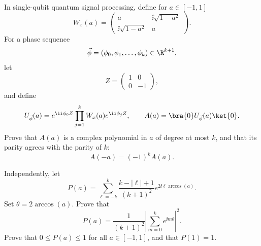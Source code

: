 In single-qubit quantum signal processing, define for $a\in[-1,1]$
$$
    W_x(a)
    =
    \begin{pmatrix}
        a & \ii\sqrt{1-a^2}\\
        \ii\sqrt{1-a^2} & a
    \end{pmatrix}.
$$
For a phase sequence
$$
    \vec\phi=(\phi_0,\phi_1,\dots,\phi_k)\in\R^{k+1},
$$
let
$$
    Z=\begin{pmatrix}1&0\\0&-1\end{pmatrix},
$$
and define
$$
    U_{\vec\phi}(a)
    =
    e^{\ii\phi_0 Z}
    \prod_{j=1}^k
    W_x(a)e^{\ii\phi_jZ},
    \qquad
    A(a)=\bra{0}U_{\vec\phi}(a)\ket{0}.
$$
Prove that $A(a)$ is a complex polynomial in $a$ of degree at most $k$, and that its parity agrees with the parity of $k$:
$$
    A(-a)=(-1)^kA(a).
$$

Independently, let
$$
    P(a)
    =
    \sum_{\ell=-k}^{k}
    \frac{k-|\ell|+1}{(k+1)^2}
    e^{2\ii\ell\arccos(a)}.
$$
Set $\theta=2\arccos(a)$.  Prove that
$$
    P(a)
    =
    \frac1{(k+1)^2}
    \left|
        \sum_{m=0}^{k}e^{\ii m\theta}
    \right|^2.
$$
Prove that $0\leq P(a)\leq1$ for all $a\in[-1,1]$, and that $P(1)=1$.

